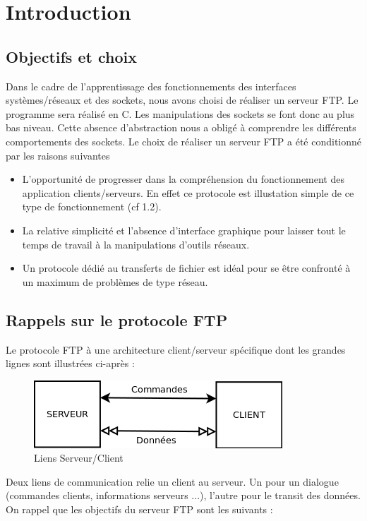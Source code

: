 \chapter{Introduction}
\section{Objectifs et choix}
Dans le cadre de l'apprentissage des fonctionnements des interfaces systèmes/réseaux et des sockets, nous avons choisi de réaliser un serveur FTP. Le programme sera réalisé en C. Les manipulations des sockets se font donc au plus bas niveau. Cette absence d'abstraction nous a obligé à comprendre les différents comportements des sockets. Le choix de réaliser un serveur FTP a été conditionné par les raisons suivantes 
\begin{itemize}
	\item
		L'opportunité de progresser dans la compréhension du fonctionnement des application clients/serveurs. En effet ce protocole est illustation simple de ce type de fonctionnement (cf 1.2).
	\item{}
		La relative simplicité et l'absence d'interface graphique pour laisser tout le temps de travail à la manipulations d'outils réseaux.
	\item{}
		Un protocole dédié au transferts de fichier est idéal pour se être confronté à un maximum de problèmes de type réseau. 		
\end{itemize}

\section{Rappels sur le protocole FTP}
Le protocole FTP à une architecture client/serveur spécifique dont les grandes lignes sont illustrées ci-après : 

\begin{figure}[!h] 
\begin{center}
  \includegraphics{cs.png}
\end{center}
\caption{Liens Serveur/Client}
\end{figure} 
Deux liens de communication relie un client au serveur. Un pour un dialogue (commandes clients, informations serveurs ...), l'autre pour le transit des données.
On rappel que les objectifs du serveur FTP sont les suivants : 

